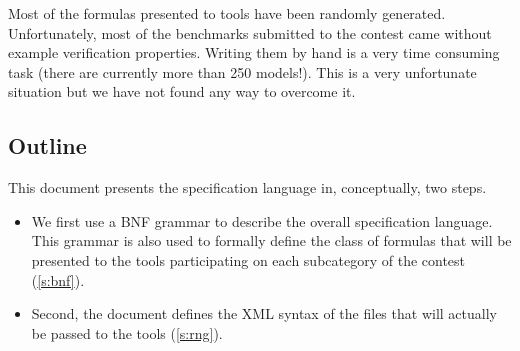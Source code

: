 \documentclass[10pt,english,a4paper]{article}
\makeatletter
\newcommand{\mcc}[0]{MCC}
\newcommand{\mccl}[0]{Model Checking Contest @ Petri Nets}
\makeatother
\begin{document}
Most of the formulas presented to tools have been randomly generated.
Unfortunately, most of the benchmarks submitted to the contest came without
example verification properties.
Writing them by hand is a very time consuming task (there are currently more
than 250 models!).
This is a very unfortunate situation but we have not found any way to
overcome it.

\iffalse
\subsection{Goals and evolution of the property language}

The property language for the \mccl{} is designed to maximize
the tools participating in the competition.
It is based on XML and allows to write structural, reachability, CTL, LTL
formulas.
It is tightly related to Petri nets, that are the modeling formalism of the
\mcc{}.

This language is designed to evolve in the future editions of the contest.
It is also designed to integrate with the \emph{Petri Net Markup Language}
(PNML) in the future.

The property language has been
extensively simplified with respect to the previous edition of the \mcc{}.
We kept compatibility in mind.
Any tool that participated in the previous edition of the contests should
only require minimal changes to accept the new version of the language.
\fi

\subsection{Outline}

This document presents the specification language in, conceptually, two steps.
\begin{itemize}
\item
  We first use a BNF grammar to describe the overall specification
  language.  This grammar is also used to formally define the class of
  formulas that will be presented to the tools participating on each
  subcategory of the contest (\cref{s:bnf}).
\item
  Second, the document defines the XML syntax of the files that will
  actually be passed to the tools (\cref{s:rng}).
\end{itemize}

\end{document}
